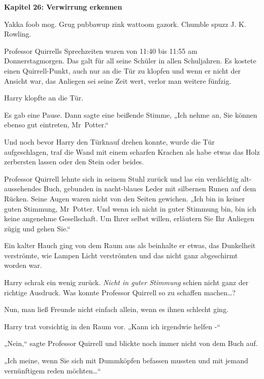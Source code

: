 

\hypertarget{verwirrung-erkennen}{%

\textbf{Kapitel 26: Verwirrung erkennen}

Yakka foob mog. Grug pubbawup zink wattoom gazork. Chumble spuzz J. K. Rowling.

\later

Professor Quirrells Sprechzeiten waren von 11:40 bis 11:55 am Donnerstagmorgen. Das galt für all seine Schüler in allen Schuljahren. Es kostete einen Quirrell-Punkt, auch nur an die Tür zu klopfen und wenn er nicht der Ansicht war, das Anliegen sei seine Zeit wert, verlor man weitere fünfzig.

Harry klopfte an die Tür.

Es gab eine Pause. Dann sagte eine beißende Stimme, „Ich nehme an, Sie können ebenso gut eintreten, Mr~Potter.“

Und noch bevor Harry den Türknauf drehen konnte, wurde die Tür aufgeschlagen, traf die Wand mit einem scharfen Krachen als habe etwas das Holz zerbersten lassen oder den Stein oder beides.

Professor Quirrell lehnte sich in seinem Stuhl zurück und las ein verdächtig alt-aussehendes Buch, gebunden in nacht-blaues Leder mit silbernen Runen auf dem Rücken. Seine Augen waren nicht von den Seiten gewichen. „Ich bin in keiner guten Stimmung, Mr~Potter. Und wenn ich nicht in guter Stimmung bin, bin ich keine angenehme Gesellschaft. Um Ihrer selbst willen, erläutern Sie Ihr Anliegen zügig und gehen Sie.“

Ein kalter Hauch ging von dem Raum aus als beinhalte er etwas, das Dunkelheit verströmte, wie Lampen Licht verströmten und das nicht ganz abgeschirmt worden war.

Harry schrak ein wenig zurück. \emph{Nicht in guter Stimmung} schien nicht ganz der richtige Ausdruck. Was konnte Professor Quirrell so zu schaffen machen…?

Nun, man ließ Freunde nicht einfach allein, wenn es ihnen schlecht ging.

Harry trat vorsichtig in den Raum vor. „Kann ich irgendwie helfen -“

„Nein,“ sagte Professor Quirrell und blickte noch immer nicht von dem Buch auf.

„Ich meine, wenn Sie sich mit Dummköpfen befassen mussten und mit jemand vernünftigem reden möchten…“

}

